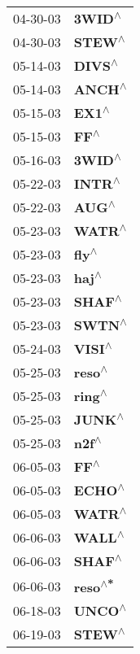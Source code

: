 \begin{supertabular}{p{0.08\textwidth}p{0.2\textwidth}}
 04-30-03 &    \textbf{3WID\textsuperscript{$\wedge$}} \\
 04-30-03 &    \textbf{STEW\textsuperscript{$\wedge$}} \\
 05-14-03 &    \textbf{DIVS\textsuperscript{$\wedge$}} \\
 05-14-03 &    \textbf{ANCH\textsuperscript{$\wedge$}} \\
 05-15-03 &     \textbf{EX1\textsuperscript{$\wedge$}} \\
 05-15-03 &      \textbf{FF\textsuperscript{$\wedge$}} \\
 05-16-03 &    \textbf{3WID\textsuperscript{$\wedge$}} \\
 05-22-03 &    \textbf{INTR\textsuperscript{$\wedge$}} \\
 05-22-03 &     \textbf{AUG\textsuperscript{$\wedge$}} \\
 05-23-03 &    \textbf{WATR\textsuperscript{$\wedge$}} \\
 05-23-03 &     \textbf{fly\textsuperscript{$\wedge$}} \\
 05-23-03 &     \textbf{haj\textsuperscript{$\wedge$}} \\
 05-23-03 &    \textbf{SHAF\textsuperscript{$\wedge$}} \\
 05-23-03 &    \textbf{SWTN\textsuperscript{$\wedge$}} \\
 05-24-03 &    \textbf{VISI\textsuperscript{$\wedge$}} \\
 05-25-03 &    \textbf{reso\textsuperscript{$\wedge$}} \\
 05-25-03 &    \textbf{ring\textsuperscript{$\wedge$}} \\
 05-25-03 &    \textbf{JUNK\textsuperscript{$\wedge$}} \\
 05-25-03 &     \textbf{n2f\textsuperscript{$\wedge$}} \\
 06-05-03 &      \textbf{FF\textsuperscript{$\wedge$}} \\
 06-05-03 &    \textbf{ECHO\textsuperscript{$\wedge$}} \\
 06-05-03 &    \textbf{WATR\textsuperscript{$\wedge$}} \\
 06-06-03 &    \textbf{WALL\textsuperscript{$\wedge$}} \\
 06-06-03 &    \textbf{SHAF\textsuperscript{$\wedge$}} \\
 06-06-03 &   \textbf{reso\textsuperscript{$\wedge$*}} \\
 06-18-03 &    \textbf{UNCO\textsuperscript{$\wedge$}} \\
 06-19-03 &    \textbf{STEW\textsuperscript{$\wedge$}} \\

\end{supertabular}
